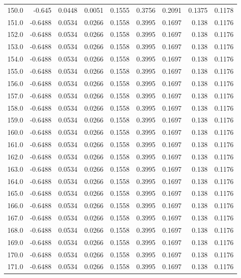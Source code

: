 \begin{longtable}{lrrrrrrrr}
150.0 & -0.645 & 0.0448 & 0.0051 & 0.1555 & 0.3756 & 0.2091 & 0.1375 & 0.1178 \\
151.0 & -0.6488 & 0.0534 & 0.0266 & 0.1558 & 0.3995 & 0.1697 & 0.138 & 0.1176 \\
152.0 & -0.6488 & 0.0534 & 0.0266 & 0.1558 & 0.3995 & 0.1697 & 0.138 & 0.1176 \\
153.0 & -0.6488 & 0.0534 & 0.0266 & 0.1558 & 0.3995 & 0.1697 & 0.138 & 0.1176 \\
154.0 & -0.6488 & 0.0534 & 0.0266 & 0.1558 & 0.3995 & 0.1697 & 0.138 & 0.1176 \\
155.0 & -0.6488 & 0.0534 & 0.0266 & 0.1558 & 0.3995 & 0.1697 & 0.138 & 0.1176 \\
156.0 & -0.6488 & 0.0534 & 0.0266 & 0.1558 & 0.3995 & 0.1697 & 0.138 & 0.1176 \\
157.0 & -0.6488 & 0.0534 & 0.0266 & 0.1558 & 0.3995 & 0.1697 & 0.138 & 0.1176 \\
158.0 & -0.6488 & 0.0534 & 0.0266 & 0.1558 & 0.3995 & 0.1697 & 0.138 & 0.1176 \\
159.0 & -0.6488 & 0.0534 & 0.0266 & 0.1558 & 0.3995 & 0.1697 & 0.138 & 0.1176 \\
160.0 & -0.6488 & 0.0534 & 0.0266 & 0.1558 & 0.3995 & 0.1697 & 0.138 & 0.1176 \\
161.0 & -0.6488 & 0.0534 & 0.0266 & 0.1558 & 0.3995 & 0.1697 & 0.138 & 0.1176 \\
162.0 & -0.6488 & 0.0534 & 0.0266 & 0.1558 & 0.3995 & 0.1697 & 0.138 & 0.1176 \\
163.0 & -0.6488 & 0.0534 & 0.0266 & 0.1558 & 0.3995 & 0.1697 & 0.138 & 0.1176 \\
164.0 & -0.6488 & 0.0534 & 0.0266 & 0.1558 & 0.3995 & 0.1697 & 0.138 & 0.1176 \\
165.0 & -0.6488 & 0.0534 & 0.0266 & 0.1558 & 0.3995 & 0.1697 & 0.138 & 0.1176 \\
166.0 & -0.6488 & 0.0534 & 0.0266 & 0.1558 & 0.3995 & 0.1697 & 0.138 & 0.1176 \\
167.0 & -0.6488 & 0.0534 & 0.0266 & 0.1558 & 0.3995 & 0.1697 & 0.138 & 0.1176 \\
168.0 & -0.6488 & 0.0534 & 0.0266 & 0.1558 & 0.3995 & 0.1697 & 0.138 & 0.1176 \\
169.0 & -0.6488 & 0.0534 & 0.0266 & 0.1558 & 0.3995 & 0.1697 & 0.138 & 0.1176 \\
170.0 & -0.6488 & 0.0534 & 0.0266 & 0.1558 & 0.3995 & 0.1697 & 0.138 & 0.1176 \\
171.0 & -0.6488 & 0.0534 & 0.0266 & 0.1558 & 0.3995 & 0.1697 & 0.138 & 0.1176 \\

\end{longtable}
